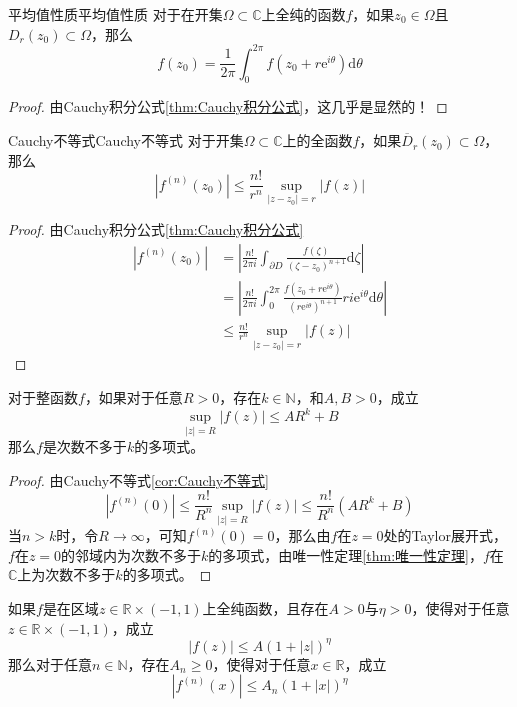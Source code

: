 \documentclass[lang = cn, scheme = chinese, thmcnt = section]{elegantbook}
\newcommand{\N}{\mathbb{N}}            %
\newcommand{\R}{\mathbb{R}}            %
\newcommand{\C}{\mathbb{C}}  		   %
\newcommand{\sub}{\subset}             %
\newcommand{\dd}{\mathrm{d}}           %
\newcommand{\ee}{\mathrm{e}^}           %
\begin{document}
\begin{corollary}{平均值性质}{平均值性质}
	对于在开集$\Omega\sub\C$上全纯的函数$f$，如果$z_0\in\Omega$且$D_r(z_0)\sub\Omega$，那么
	$$
	f(z_0)=\frac{1}{2\pi}\int_0^{2\pi}{f(z_0+r\mathrm{e}^{i\theta})\mathrm{d}\theta}
	$$
\end{corollary}

\begin{proof}
	由Cauchy积分公式\ref{thm:Cauchy积分公式}，这几乎是显然的！
\end{proof}

\begin{corollary}{Cauchy不等式}{Cauchy不等式}
	对于开集$\Omega\sub\C$上的全函数$f$，如果$\overline{D}_r(z_0)\sub\Omega$，那么
	$$
	|f^{(n)}(z_0)| \le \frac{n!}{r^n}\sup_{|z-z_0|=r}|f(z)|
	$$
\end{corollary}

\begin{proof}
	由Cauchy积分公式\ref{thm:Cauchy积分公式}
	\begin{align*}
		|f^{(n)}(z_0)|
		& = \left| \frac{n!}{2\pi i}\int_{\partial D}{\frac{f(\zeta)}{(\zeta-z_0)^{n+1}}\mathrm{d}\zeta} \right|\\
		& = \left| \frac{n!}{2\pi i}\int_{0}^{2\pi}\frac{f(z_0+r\ee{i\theta})}{(r\ee{i\theta})^{n+1}}ri\ee{i\theta}\dd\theta \right|\\
		& \le \frac{n!}{r^n}\sup_{|z-z_0|=r}|f(z)|
	\end{align*}
\end{proof}

\begin{proposition}
	对于整函数$f$，如果对于任意$R>0$，存在$k\in\N$，和$A,B>0$​，成立
	$$
	\sup_{|z|=R}|f(z)|\le AR^k+B
	$$
	那么$f$是次数不多于$k$的多项式。
\end{proposition}

\begin{proof}
	由Cauchy不等式\ref{cor:Cauchy不等式}
	$$
	|f^{(n)}(0)| \le \frac{n!}{R^n}\sup_{|z|=R}|f(z)|\le \frac{n!}{R^n}(AR^k+B)
	$$
	当$n>k$时，令$R\to\infty$，可知$f^{(n)}(0)=0$，那么由$f$在$z=0$处的Taylor展开式，$f$在$z=0$的邻域内为次数不多于$k$的多项式，由唯一性定理\ref{thm:唯一性定理}，$f$在$\C$上为次数不多于$k$的多项式。
\end{proof}

\begin{proposition}
	如果$f$是在区域$z\in\R\times(-1,1)$上全纯函数，且存在$A>0$与$\eta>0$，使得对于任意$z\in\R\times(-1,1)$，成立
	$$
	|f(z)|\le A(1+|z|)^\eta
	$$
	那么对于任意$n\in\N$，存在$A_n\ge 0$，使得对于任意$x\in\R$，成立
	$$
	|f^{(n)}(x)|\le A_n(1+|x|)^\eta
	$$
\end{proposition}
\end{document}
